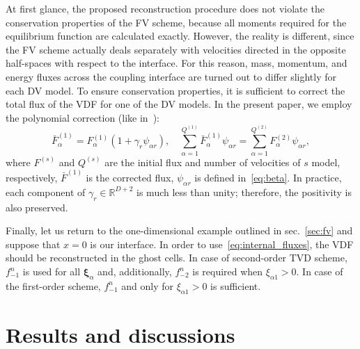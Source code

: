 \documentclass{article}
\newcommand{\bxi}{{\boldsymbol{\xi}}}
\newcommand{\bxia}{\bxi_\alpha}
\begin{document}
At first glance, the proposed reconstruction procedure does not violate the conservation properties of the FV scheme,
because all moments required for the equilibrium function are calculated exactly.
However, the reality is different, since the FV scheme actually deals separately
with velocities directed in the opposite half-spaces with respect to the interface.
For this reason, mass, momentum, and energy fluxes across the coupling interface
are turned out to differ slightly for each DV model.
To ensure conservation properties, it is sufficient to correct the total flux of the VDF for one of the DV models.
In the present paper, we employ the polynomial correction (like in~\cite{Aristov1980}):
\begin{equation}\label{eq:poly_correction}
    \bar{F}^{(1)}_\alpha = F^{(1)}_\alpha(1+\gamma_r\psi_{\alpha r}), \quad
    \sum_{\alpha=1}^{Q^{(1)}} \bar{F}^{(1)}_\alpha\psi_{\alpha r} = \sum_{\alpha=1}^{Q^{(2)}} F^{(2)}_\alpha\psi_{\alpha r},
\end{equation}
where \(F^{(s)}\) and \(Q^{(s)}\) are the initial flux and number of velocities of \(s\) model, respectively,
\(\bar{F}^{(1)}\) is the corrected flux, \(\psi_{\alpha r}\) is defined in~\eqref{eq:beta}.
In practice, each component of \(\gamma_r\in\mathbb{R}^{D+2}\) is much less than unity;
therefore, the positivity is also preserved.

Finally, let us return to the one-dimensional example outlined in sec.~\ref{sec:fv}
and suppose that \(x=0\) is our interface.
In order to use~\eqref{eq:internal_fluxes}, the VDF should be reconstructed in the ghost cells.
In case of second-order TVD scheme, \(f_{-1}^n\) is used for all \(\bxia\) and, additionally,
\(f_{-2}^n\) is required when \(\xi_{\alpha1}>0\).
In case of the first-order scheme, \(f_{-1}^n\) and only for \(\xi_{\alpha1}>0\) is sufficient.

\section{Results and discussions}\label{sec:examples}
\end{document}
